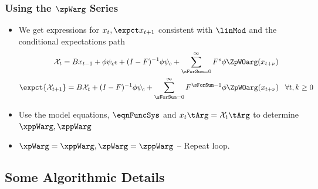 \documentclass[notheorems]{beamer}
\begin{document}
\begin{frame}
  \frametitle{Using the $\zpWarg$ Series}
{\small
  \begin{itemize}
  \item We get expressions for $x_t, \expct x_{t+1}$ consistent with $\linMod$ and the conditional expectations path
   \begin{gather*}
     \mathcal{X}_{t} =B x_{t-1}+ \phi \psi_\epsilon\epsilon + (I - F)^{-1} \phi \psi_c + \sum_{\sForSum=0}^\infty F^s \phi \ZpWOarg(x_{t+\nu})\\
	\expct{ \mathcal{X}_{t+1}} =B \mathcal{X}_{t}  + (I - F)^{-1} \phi \psi_c+ \sum_{\sForSum =0}^\infty F^{\sForSum-1} \phi \ZpWOarg(x_{t+\nu}) \,\,\,\,\,\forall t,k \ge  0
\end{gather*}
\item Use the model equations, $\eqnFuncSys$ and $x_t\tArg=\mathcal{X}_t\tArg$ to determine $\xppWarg, \zppWarg$
\item $\xpWarg=\xppWarg, \zpWarg=\zppWarg$ -- {\color{green} Repeat loop.}
  \end{itemize}
}
\end{frame}






\subsection{{Some Algorithmic Details}}
\end{document}
